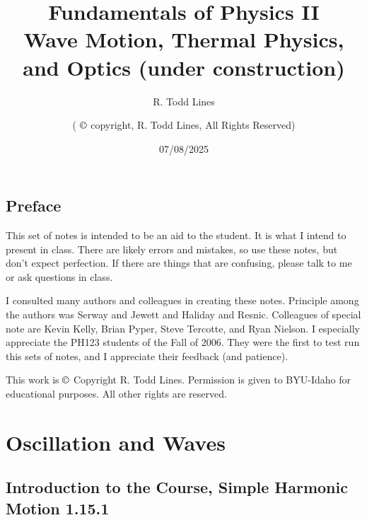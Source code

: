 \documentclass{book}
\begin{document}
\frontmatter
\title{{\Large Fundamentals of Physics II}\\
{\Large Wave Motion, Thermal Physics, and Optics (under construction)}}
\author{R. Todd Lines \and (%
$\copyright$%
copyright, R. Todd Lines, All Rights Reserved)}
\date{07/08/2025}
\maketitle
\tableofcontents

\chapter{Preface}

This set of notes is intended to be an aid to the student. It is what I
intend to present in class. There are likely errors and mistakes, so use
these notes, but don't expect perfection. If there are things that are
confusing, please talk to me or ask questions in class.

I consulted many authors and colleagues in creating these notes. Principle
among the authors was Serway and Jewett and Haliday and Resnic. Colleagues
of special note are Kevin Kelly, Brian Pyper, Steve Tercotte, and Ryan
Nielson. I especially appreciate the PH123 students of the Fall of 2006.
They were the first to test run this sets of notes, and I appreciate their
feedback (and patience).

This work is 
$\copyright$
Copyright R. Todd Lines. Permission is given to BYU-Idaho for educational
purposes. All other rights are reserved.

\mainmatter

%

\part{Oscillation and Waves}

\chapter{Introduction to the Course, Simple Harmonic Motion 1.15.1}

%
\end{document}
